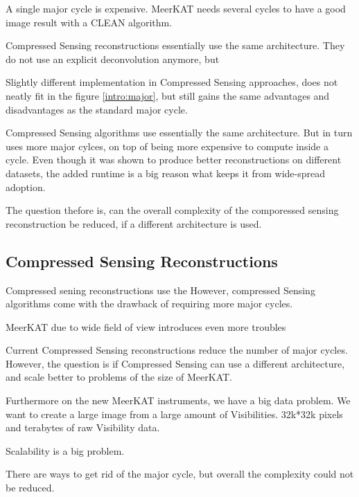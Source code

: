 A single major cycle is expensive. MeerKAT needs several cycles to have a good image result with a CLEAN algorithm.


Compressed Sensing reconstructions essentially use the same architecture. They do not use an explicit deconvolution anymore, but 

Slightly different implementation in Compressed Sensing approaches, does not neatly fit in the figure \ref{intro:major}, but still gains the same advantages and disadvantages as the standard major cycle. 

Compressed Sensing algorithms use essentially the same architecture. But in turn uses more major cylces, on top of being more expensive to compute inside a cycle. Even though it was shown to produce better reconstructions on different datasets, the added runtime is a big reason what keeps it from wide-spread adoption. 

The question thefore is, can the overall complexity of the comporessed sensing reconstruction be reduced, if a different architecture is used.


\subsection{Compressed Sensing Reconstructions}
Compressed sening reconstructions use the 
 However, compressed Sensing algorithms come with the drawback of requiring more major cycles.

MeerKAT due to wide field of view introduces even more troubles

Current Compressed Sensing reconstructions reduce the number of major cycles. However, the question is if Compressed Sensing can use a different architecture, and scale better to problems of the size of MeerKAT.

Furthermore on the new MeerKAT instruments, we have a big data problem. We want to create a large image from a large amount of Visibilities. 32k*32k pixels and terabytes of raw Visibility data. 

Scalability is a big problem.

There are ways to get rid of the major cycle, but overall the complexity could not be reduced.









